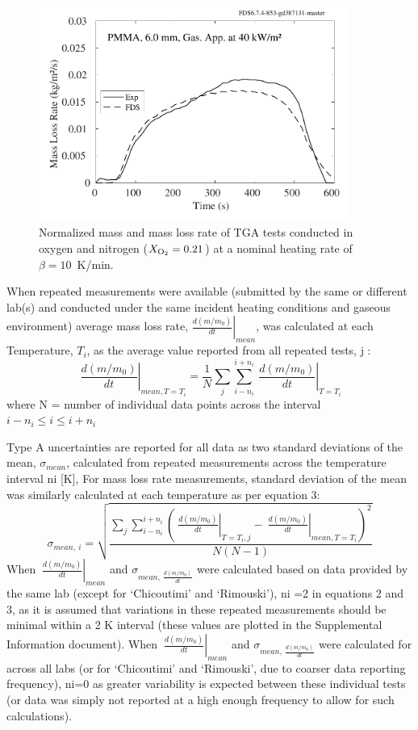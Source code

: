 \documentclass{book}
\begin{document}
\begin{figure}
  \centering
  \includegraphics[width=4in]{SCRIPT_FIGURES/PMMA_40}
  \caption{Normalized mass and mass loss rate of TGA tests conducted in oxygen and nitrogen ($X_{\rm O_2}=0.21$) at a nominal heating rate of $\beta=10$~K/min.}
  \label{Fig_8}
\end{figure}

When repeated measurements were available (submitted by the same or different lab(s) and conducted under the same incident heating conditions and gaseous environment) average mass loss rate, $\left.\frac{d\left(m/m_0\right)}{dt}\right|_{mean}$, was calculated at each Temperature, $T_i$, as the average value reported from all repeated tests, j :
\begin{equation}
\left.\ \frac{d\left(m/m_0\right)}{dt}\right|_{mean,T=T_i}=\frac{1}{N}\sum_{j}\sum_{i-n_i}^{i+n_i}\left.\ \frac{d\left(m/m_0\right)}{dt}\right|_{T=T_i}
\end{equation}
where N = number of individual data points across the interval $i-n_i\le i\le i+n_i$

Type A uncertainties are reported for all data as two standard deviations of the mean, $\sigma_{mean}$, calculated from repeated measurements across the temperature interval ni [K], For mass loss rate measurements, standard deviation of the mean was similarly calculated at each temperature as per equation 3:
\begin{equation}
  \sigma_{mean,\ i}=\sqrt{\frac{\sum_{j}\sum_{i-n_i}^{i+n_i}\left(\left.\ \frac{d\left(m/m_0\right)}{dt}\right|_{T=T_i,j}-\left.\ \frac{d\left(m/m_0\right)}{dt}\right|_{mean,T=T_i}\right)^2}{N\left(N-1\right)}}
\end{equation}
When $\left.\ \frac{d\left(m/m_0\right)}{dt}\right|_{mean}$ and $\sigma_{mean,\ \frac{d\left(m/m_0\right)}{dt}}$ were calculated based on data provided by the same lab (except for ‘Chicoutimi’ and ‘Rimouski’), ni =2 in equations 2 and 3, as it is assumed that variations in these repeated measurements should be minimal within a 2 K interval (these values are plotted in the Supplemental Information document). When $\left.\ \frac{d\left(m/m_0\right)}{dt}\right|_{mean}$ and $\sigma_{mean,\ \frac{d\left(m/m_0\right)}{dt}}$  were calculated for across all labs (or for ‘Chicoutimi’ and ‘Rimouski’, due to coarser data reporting frequency), ni=0 as greater variability is expected between these individual tests (or data was simply not reported at a high enough frequency to allow for such calculations).
\end{document}
